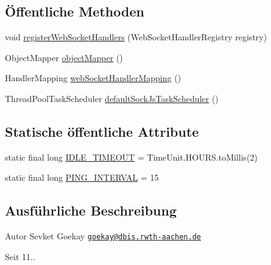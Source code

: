 \subsection*{Öffentliche Methoden}
\begin{DoxyCompactItemize}
\item 
void \hyperlink{classde_1_1rwth_1_1idsg_1_1steve_1_1config_1_1_web_socket_configuration_a5b9a235259f47b986eea0f931599700b}{register\-Web\-Socket\-Handlers} (Web\-Socket\-Handler\-Registry registry)
\item 
Object\-Mapper \hyperlink{classde_1_1rwth_1_1idsg_1_1steve_1_1config_1_1_web_socket_configuration_af0f897fbe1970c78fc61e476e50e8c6d}{object\-Mapper} ()
\item 
Handler\-Mapping \hyperlink{classde_1_1rwth_1_1idsg_1_1steve_1_1config_1_1_web_socket_configuration_ae4bdb11cf22e1d830dbde50f33f101aa}{web\-Socket\-Handler\-Mapping} ()
\item 
Thread\-Pool\-Task\-Scheduler \hyperlink{classde_1_1rwth_1_1idsg_1_1steve_1_1config_1_1_web_socket_configuration_a920d2f16bdc5ddc7e7805aec22e2faf5}{default\-Sock\-Js\-Task\-Scheduler} ()
\end{DoxyCompactItemize}
\subsection*{Statische öffentliche Attribute}
\begin{DoxyCompactItemize}
\item 
static final long \hyperlink{classde_1_1rwth_1_1idsg_1_1steve_1_1config_1_1_web_socket_configuration_a6a950c6ec954540c66dda295b8fb40b9}{I\-D\-L\-E\-\_\-\-T\-I\-M\-E\-O\-U\-T} = Time\-Unit.\-H\-O\-U\-R\-S.\-to\-Millis(2)
\item 
static final long \hyperlink{classde_1_1rwth_1_1idsg_1_1steve_1_1config_1_1_web_socket_configuration_aa11b5dc252d4aa2d65e849afe891c1d3}{P\-I\-N\-G\-\_\-\-I\-N\-T\-E\-R\-V\-A\-L} = 15
\end{DoxyCompactItemize}


\subsection{Ausführliche Beschreibung}
\begin{DoxyAuthor}{Autor}
Sevket Goekay \href{mailto:goekay@dbis.rwth-aachen.de}{\tt goekay@dbis.\-rwth-\/aachen.\-de} 
\end{DoxyAuthor}
\begin{DoxySince}{Seit}
11.. 
\end{DoxySince}


